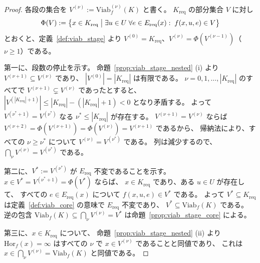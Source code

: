 \begin{proof}
各段の集合を $V^{(\nu)}:=\mathrm{Viab}_f^{(\nu)}(K)$ と書く。
$K_{\mathrm{req}}$ の部分集合 $V$ に対し
\[
  \Phi(V):=\bigl\{x\in K_{\mathrm{req}}\bigm|\exists u\in U\;\forall e\in E_{\mathrm{req}}(x):\;f(x,u,e)\in V\bigr\}
\]
とおくと、定義~\ref{def:viab_stage} より $V^{(0)}=K_{\mathrm{req}}$、$V^{(\nu)}=\Phi(V^{(\nu-1)})$（$\nu\ge1$）である。

第一に、段数の停止を示す。
命題~\ref{prop:viab_stage_nested} (i) より $V^{(\nu+1)}\subseteq V^{(\nu)}$ であり、
$|V^{(0)}|=|K_{\mathrm{req}}|$ は有限である。
$\nu=0,1,\ldots,|K_{\mathrm{req}}|$ のすべてで $V^{(\nu+1)}\subsetneq V^{(\nu)}$ であったとすると、
$|V^{(|K_{\mathrm{req}}|+1)}|\le|K_{\mathrm{req}}|-(|K_{\mathrm{req}}|+1)<0$ となり矛盾する。
よって $V^{(\nu^{\ast}+1)}=V^{(\nu^{\ast})}$ なる $\nu^{\ast}\le|K_{\mathrm{req}}|$ が存在する。
$V^{(\nu+1)}=V^{(\nu)}$ ならば $V^{(\nu+2)}=\Phi(V^{(\nu+1)})=\Phi(V^{(\nu)})=V^{(\nu+1)}$ であるから、
帰納法により、すべての $\nu\ge\nu^{\ast}$ について $V^{(\nu)}=V^{(\nu^{\ast})}$ である。
列は減少するので、$\bigcap_{\nu}V^{(\nu)}=V^{(\nu^{\ast})}$ である。

第二に、$V^{\ast}:=V^{(\nu^{\ast})}$ が $E_{\mathrm{req}}$ 不変であることを示す。
$x\in V^{\ast}=V^{(\nu^{\ast}+1)}=\Phi(V^{\ast})$ ならば、
$x\in K_{\mathrm{req}}$ であり、ある $u\in U$ が存在して、
すべての $e\in E_{\mathrm{req}}(x)$ について $f(x,u,e)\in V^{\ast}$ である。
よって $V^{\ast}\subseteq K_{\mathrm{req}}$ は定義~\ref{def:viab_core} の意味で $E_{\mathrm{req}}$ 不変であり、
$V^{\ast}\subseteq\mathrm{Viab}_f(K)$ である。
逆の包含 $\mathrm{Viab}_f(K)\subseteq\bigcap_{\nu}V^{(\nu)}=V^{\ast}$ は命題~\ref{prop:viab_stage_core} による。

第三に、$x\in K_{\mathrm{req}}$ について、
命題~\ref{prop:viab_stage_nested} (ii) より
$\mathrm{Hor}_f(x)=\infty$ はすべての $\nu$ で $x\in V^{(\nu)}$ であることと同値であり、
これは $x\in\bigcap_{\nu}V^{(\nu)}=\mathrm{Viab}_f(K)$ と同値である。
\end{proof}

